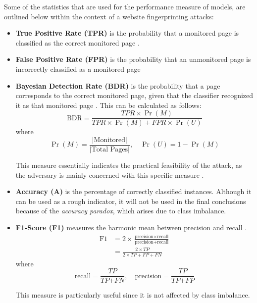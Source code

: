 Some of the statistics that are used for the performance measure of models, are outlined below within the context of a website fingerprinting attacks:
\begin{itemize}
  \item \textbf{True Positive Rate (TPR)} is the probability that a monitored page is classified as the correct monitored page \cite{kfingerprinting}.

  \item \textbf{False Positive Rate (FPR)} is the probability that an unmonitored page is incorrectly classified as a monitored page \cite{kfingerprinting}

  \item \textbf{Bayesian Detection Rate (BDR)} is the probability that a page corresponds to the correct monitored page, given that the classifier recognized it as that monitored page \cite{kfingerprinting}.
    This can be calculated as follows:
    $$\text{BDR} = \frac{\textit{TPR} \times \Pr(M)}{\textit{TPR} \times \Pr(M) + \textit{FPR} \times \Pr(U)}$$
    where
    $$\Pr(M) = \frac{|\text{Monitored}|}{|\text{Total Pages}|}, \quad \Pr(U) = 1 - \Pr(M)$$

    This measure essentially indicates the practical feasibility of the attack, as the adversary is mainly concerned with this specific measure \cite{kfingerprinting}.

  \item \textbf{Accuracy (A)} is the percentage of correctly classified instances.
    Although it can be used as a rough indicator, it will not be used in the final conclusions because of the \textit{accuracy paradox}, which arises due to class imbalance.

  \item \textbf{F1-Score (F1)} measures the harmonic mean between precision and recall \cite{scikitlearn}.
    \begin{align*}
      \text{F1} &= 2 \times \frac{\text{precision} \times \text{recall}}{\text{precision} + \text{recall}}\\
                &= \frac{2 \times \textit{TP}}{2 \times \textit{TP} + \textit{FP} + \textit{FN}}
    \end{align*}
    where
    $$\text{recall} = \frac{\textit{TP}}{\textit{TP} + \textit{FN}}, \quad \text{precision} = \frac{\textit{TP}}{\textit{TP} + \textit{FP}}$$

    This measure is particularly useful since it is not affected by class imbalance.
\end{itemize}

